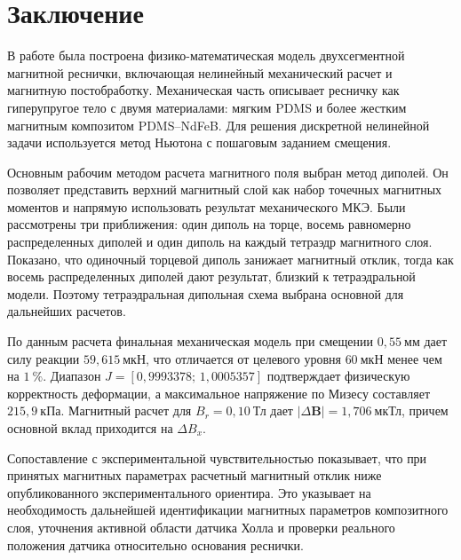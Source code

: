 \documentclass[14pt,a4paper]{extarticle}
\newcommand{\unnumberedsection}[1]{%
    \clearpage
    \phantomsection
    \section*{#1}
    \addcontentsline{toc}{section}{#1}%
}
\begin{document}

\unnumberedsection{Заключение}

В работе была построена физико-математическая модель двухсегментной магнитной реснички, включающая нелинейный механический расчет и магнитную постобработку. Механическая часть описывает ресничку как гиперупругое тело с двумя материалами: мягким PDMS и более жестким магнитным композитом PDMS--NdFeB. Для решения дискретной нелинейной задачи используется метод Ньютона с пошаговым заданием смещения.

Основным рабочим методом расчета магнитного поля выбран метод диполей. Он позволяет представить верхний магнитный слой как набор точечных магнитных моментов и напрямую использовать результат механического МКЭ. Были рассмотрены три приближения: один диполь на торце, восемь равномерно распределенных диполей и один диполь на каждый тетраэдр магнитного слоя. Показано, что одиночный торцевой диполь занижает магнитный отклик, тогда как восемь распределенных диполей дают результат, близкий к тетраэдральной модели. Поэтому тетраэдральная дипольная схема выбрана основной для дальнейших расчетов.

По данным расчета финальная механическая модель при смещении \(0,55~\text{мм}\) дает силу реакции \(59,615~\text{мкН}\), что отличается от целевого уровня \(60~\text{мкН}\) менее чем на \(1~\%\). Диапазон \(J=[0,9993378;\,1,0005357]\) подтверждает физическую корректность деформации, а максимальное напряжение по Мизесу составляет \(215,9~\text{кПа}\). Магнитный расчет для \(B_r=0,10~\text{Тл}\) дает \(|\Delta\mathbf{B}|=1,706~\text{мкТл}\), причем основной вклад приходится на \(\Delta B_x\).

Сопоставление с экспериментальной чувствительностью \cite{man2023} показывает, что при принятых магнитных параметрах расчетный магнитный отклик ниже опубликованного экспериментального ориентира. Это указывает на необходимость дальнейшей идентификации магнитных параметров композитного слоя, уточнения активной области датчика Холла и проверки реального положения датчика относительно основания реснички.
\end{document}
